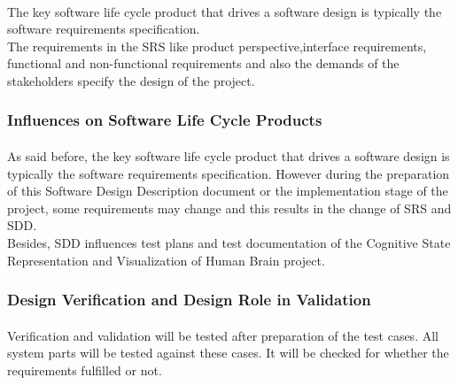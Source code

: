 \paragraph{}
\normalsize
     The key software life cycle product that drives a software design is typically the software requirements specification.\\
     
     The requirements in the SRS like product perspective,interface requirements, functional and non-functional requirements and also the demands of the stakeholders specify the design of the project.

\skipsubsection

\subsubsection{Influences on Software Life Cycle Products}
\paragraph{}
\normalsize
	As said before, the key software life cycle product that drives a software design is typically the software requirements specification. However during the preparation of this Software Design Description document or the implementation stage of the project, some requirements may change and this results in the change of SRS and SDD.\\

	Besides, SDD influences test plans and test documentation of the Cognitive State Representation and Visualization of Human Brain project.

\skipsubsection

\subsubsection{Design Verification and Design Role in Validation}
\paragraph{}
\normalsize
	Verification and validation will be tested after preparation of the test cases. All system parts will be tested against these cases. It will be checked for whether the requirements fulfilled or not. 

\skipsubsection
    

